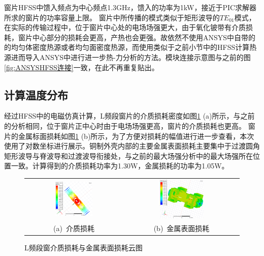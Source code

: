 \documentclass[master]{thesis-uestc}
\begin{document}
窗片HFSS中馈入频点为中心频点1.3GHz，馈入的功率为1kW，接近于PIC求解器所求的窗片的功率容量上限。
窗片中所传播的模式类似于矩形波导的\(TE_{01}\)模式，在实际的传输过程中，位于窗片中心处的电场场强更大，由于氧化铍带有介质损耗，窗片中心部分的损耗会更高，产热也会更强。故依然不使用ANSYS中自带的的均匀体密度热源或者均匀面密度热源，而使用类似于之前小节中的HFSS计算热源进而导入ANSYS中进行进一步热-力分析的方法。模块连接示意图与之前的图\ref{fig:ANSYSHFSS连接}一致，在此不再重复贴出。

\subsection{计算温度分布}
经过HFSS中的电磁仿真计算，L频段窗片的介质损耗密度如图\ref{fig:L体损耗与面损耗} (a)所示，与之前的分析相同，位于窗片正中心时由于电场场强更高，窗片的介质损耗也更高。
窗片的金属标面损耗如图\ref{fig:L体损耗与面损耗} (b)所示，为了方便对损耗的幅值进行进一步查看，本次使用了对数坐标进行展示。铜制外壳内部的主要金属表面损耗主要集中于过渡圆角矩形波导与脊波导和过渡波导衔接处，与之前的最大场强分析中的最大场强所在位置一致。计算得到的介质损耗功率为1.30W，金属损耗的功率为1.05W。
\begin{figure}[!htb]
    \small
    \centering
    \begin{tabular}{@{\ }c@{\ }c}
        \includegraphics[width=0.4\textwidth]{pic/chapter4/L窗片介质损耗.png} & 
        \hspace{5pt}
        \includegraphics[width=0.4\textwidth]{pic/chapter4/L金属表面损耗.png}     \\
        \mbox{\small (a) 介质损耗}                                                                               & 
        \mbox{\small (b) 金属表面损耗}                                                                                  \\
    \end{tabular}
    \caption{L频段窗介质损耗与金属表面损耗云图}
    \label{fig:L体损耗与面损耗}
\end{figure}
\end{document}
